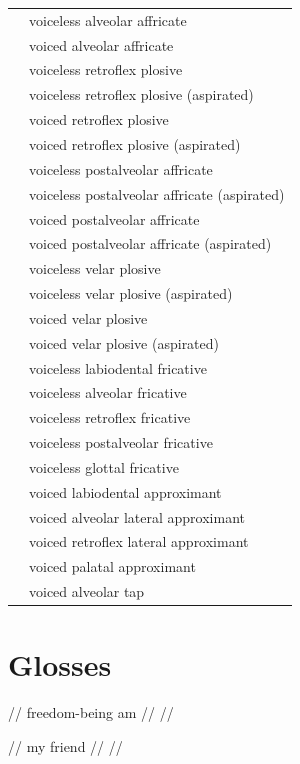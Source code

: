 \documentclass{article}
\begin{document}
\begin{xltabular}{\textwidth}{lL}
   & voiceless alveolar affricate \\
   & voiced alveolar affricate \\
   & voiceless retroflex plosive \\
   & voiceless retroflex plosive (aspirated) \\
   & voiced retroflex plosive \\
   & voiced retroflex plosive (aspirated) \\
   & voiceless postalveolar affricate \\
   & voiceless postalveolar affricate (aspirated) \\
   & voiced postalveolar affricate \\
   & voiced postalveolar affricate (aspirated) \\
   & voiceless velar plosive \\
   & voiceless velar plosive (aspirated) \\
   & voiced velar plosive \\
   & voiced velar plosive (aspirated) \\
   & voiceless labiodental fricative \\
   & voiceless alveolar fricative \\
   & voiceless retroflex fricative \\
   & voiceless postalveolar fricative \\
   & voiceless glottal fricative \\
   & voiced labiodental approximant \\
   & voiced alveolar lateral approximant \\
   & voiced retroflex lateral approximant \\
   & voiced palatal approximant \\
   & voiced alveolar tap \\
\end{xltabular}

\newpage\section{Glosses}

\ex
\begingl
\gla {}   //
 freedom-being am //
 //
\endgl
\xe

\ex
\begingl
\gla {}   //
 my friend //
 //
\endgl
\xe
\end{document}
